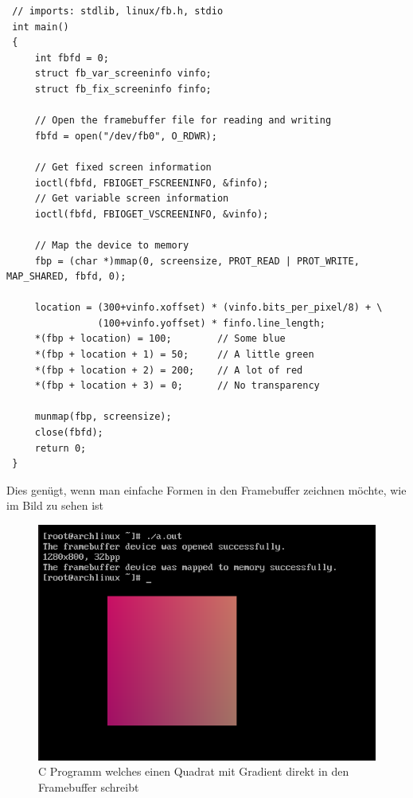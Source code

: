 \begin{verbatim}
 // imports: stdlib, linux/fb.h, stdio
 int main()
 {
     int fbfd = 0;
     struct fb_var_screeninfo vinfo;
     struct fb_fix_screeninfo finfo;
     
     // Open the framebuffer file for reading and writing
     fbfd = open("/dev/fb0", O_RDWR);
          
     // Get fixed screen information
     ioctl(fbfd, FBIOGET_FSCREENINFO, &finfo);
     // Get variable screen information
     ioctl(fbfd, FBIOGET_VSCREENINFO, &vinfo);
  
     // Map the device to memory
     fbp = (char *)mmap(0, screensize, PROT_READ | PROT_WRITE, MAP_SHARED, fbfd, 0);
 
     location = (300+vinfo.xoffset) * (vinfo.bits_per_pixel/8) + \
                (100+vinfo.yoffset) * finfo.line_length;
     *(fbp + location) = 100;        // Some blue
     *(fbp + location + 1) = 50;     // A little green
     *(fbp + location + 2) = 200;    // A lot of red
     *(fbp + location + 3) = 0;      // No transparency

     munmap(fbp, screensize);
     close(fbfd);
     return 0;
 }
\end{verbatim}
Dies genügt, wenn man einfache Formen in den Framebuffer zeichnen möchte, wie im Bild zu sehen ist
\begin{figure}[h]
  \centering
  \includegraphics[scale=0.7]{realisierung/images/framebuffer-rectangle.png}
  \caption{C Programm welches einen Quadrat mit Gradient direkt in den Framebuffer schreibt}
\end{figure}

